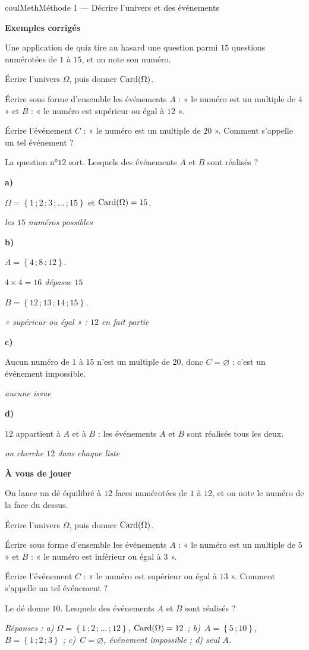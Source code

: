 \documentclass[11pt,a4paper]{article}
\makeatletter
\newcommand{\lycee@ens}[1]{\left\{#1\right\}}
\providecommand{\ens}{\lycee@ens}}
\newcounter{lycee@signet}
\newcommand{\signet}[3][]{\stepcounter{lycee@signet}%
  \edef\lycee@dest{\if\relax\detokenize{#1}\relax
    signet.\arabic{lycee@signet}\else#1\fi}%
  \hypertarget{\lycee@dest}{}\bookmark[level=#2,dest=\lycee@dest]{#3}}
\newcommand{\res}[1]{#1}
\newcounter{methode}
\newenvironment{methodebox}[1][Méthode]{\stepcounter{methode}%
  \begin{boitecours}[phantom={\signet[methode-\arabic{methode}]{2}{#1}}]{coulMeth}{#1}}%
  {\end{boitecours}}
\newcommand{\etape}[1]{\par\smallskip\textbf{\color{coulMeth}#1}\par\nobreak\smallskip}
\newcommand{\reponse}[1]{\par\smallskip
  {\footnotesize\itshape\color{black!55}Réponses : #1}}
\newcommand{\explique}[2]{\par\smallskip\noindent
  \begin{minipage}[t]{0.57\linewidth}\raggedright #1\end{minipage}\hfill
  \begin{minipage}[t]{0.40\linewidth}\raggedright\leavevmode
    {\small\itshape\color{black!60}#2}\end{minipage}\par}
\newcommand{\cas}[1]{\par\smallskip\noindent\textbf{\color{coulExo}#1}\vadjust{\nobreak}}
\newenvironment{correction}{\par}{\par}
\newcommand{\etapeexemples}{\etape{Exemples corrigés}}
\makeatother
\begin{document}
\begin{methodebox}[Méthode 1 --- Décrire l'univers et des événements]
\etapeexemples
Une application de quiz tire au hasard une question parmi $15$ questions numérotées
de $1$ à $15$, et on note son numéro.
\begin{questions}[label=\alph*)]
  \item Écrire l'univers $\Omega$, puis donner $\operatorname{Card}(\Omega)$.
  \item Écrire sous forme d'ensemble les événements $A$ : « le numéro est un multiple
    de $4$ » et $B$ : « le numéro est supérieur ou égal à $12$ ».
  \item Écrire l'événement $C$ : « le numéro est un multiple de $20$ ». Comment
    s'appelle un tel événement ?
  \item La question n°$12$ sort. Lesquels des événements $A$ et $B$ sont réalisés ?
\end{questions}
\begin{correction}
\cas{a)}
\explique{$\Omega=\res{\ens{1\,;2\,;3\,;\dots\,;15}}$ et $\Card(\Omega)=\res{15}$.}{les
$15$ numéros possibles}
\cas{b)}
\explique{$A=\res{\ens{4\,;8\,;12}}$.}{$4\times 4=16$ dépasse $15$}
\explique{$B=\res{\ens{12\,;13\,;14\,;15}}$.}{« supérieur ou égal » : $12$ en fait
partie}
\cas{c)}
\explique{Aucun numéro de $1$ à $15$ n'est un multiple de $20$, donc
$C=\res{\varnothing}$ : c'est un \res{événement impossible}.}{aucune issue}
\cas{d)}
\explique{$12$ appartient à $A$ et à $B$ : \res{les événements $A$ et $B$ sont
réalisés tous les deux}.}{on cherche $12$ dans chaque liste}
\end{correction}

\etape{À vous de jouer}
On lance un dé équilibré à $12$ faces numérotées de $1$ à $12$, et on note le numéro
de la face du dessus.
\begin{questions}[label=\alph*)]
  \item Écrire l'univers $\Omega$, puis donner $\operatorname{Card}(\Omega)$.
  \item Écrire sous forme d'ensemble les événements $A$ : « le numéro est un multiple
    de $5$ » et $B$ : « le numéro est inférieur ou égal à $3$ ».
  \item Écrire l'événement $C$ : « le numéro est supérieur ou égal à $13$ ». Comment
    s'appelle un tel événement ?
  \item Le dé donne $10$. Lesquels des événements $A$ et $B$ sont réalisés ?
\end{questions}
\reponse{a) $\Omega=\ens{1\,;2\,;\dots\,;12}$, $\operatorname{Card}(\Omega)=12$ ; b)~$A=\ens{5\,;10}$,
$B=\ens{1\,;2\,;3}$ ; c)~$C=\varnothing$, événement impossible ; d) seul $A$.}
\end{methodebox}
\end{document}
